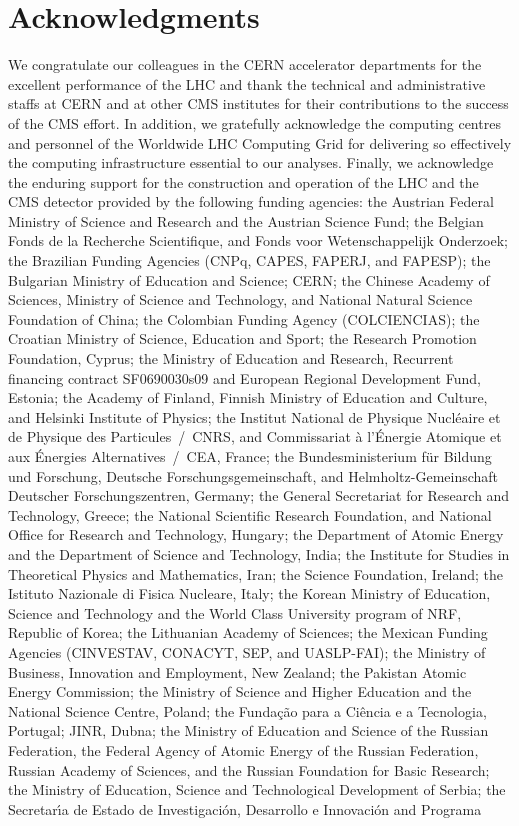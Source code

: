 \documentclass[12pt,twoside,a4paper,cmspaper,final,collab]{cms-tdr}
\begin{document}
\section*{Acknowledgments}

 We congratulate our colleagues in the CERN accelerator departments for the excellent performance of the LHC and thank the technical and administrative staffs at CERN and at other CMS institutes for their contributions to the success of the CMS effort. In addition, we gratefully acknowledge the computing centres and personnel of the Worldwide LHC Computing Grid for delivering so effectively the computing infrastructure essential to our analyses. Finally, we acknowledge the enduring support for the construction and operation of the LHC and the CMS detector provided by the following funding agencies: the Austrian Federal Ministry of Science and Research and the Austrian Science Fund; the Belgian Fonds de la Recherche Scientifique, and Fonds voor Wetenschappelijk Onderzoek; the Brazilian Funding Agencies (CNPq, CAPES, FAPERJ, and FAPESP); the Bulgarian Ministry of Education and Science; CERN; the Chinese Academy of Sciences, Ministry of Science and Technology, and National Natural Science Foundation of China; the Colombian Funding Agency (COLCIENCIAS); the Croatian Ministry of Science, Education and Sport; the Research Promotion Foundation, Cyprus; the Ministry of Education and Research, Recurrent financing contract SF0690030s09 and European Regional Development Fund, Estonia; the Academy of Finland, Finnish Ministry of Education and Culture, and Helsinki Institute of Physics; the Institut National de Physique Nucl\'eaire et de Physique des Particules~/~CNRS, and Commissariat \`a l'\'Energie Atomique et aux \'Energies Alternatives~/~CEA, France; the Bundesministerium f\"ur Bildung und Forschung, Deutsche Forschungsgemeinschaft, and Helmholtz-Gemeinschaft Deutscher Forschungszentren, Germany; the General Secretariat for Research and Technology, Greece; the National Scientific Research Foundation, and National Office for Research and Technology, Hungary; the Department of Atomic Energy and the Department of Science and Technology, India; the Institute for Studies in Theoretical Physics and Mathematics, Iran; the Science Foundation, Ireland; the Istituto Nazionale di Fisica Nucleare, Italy; the Korean Ministry of Education, Science and Technology and the World Class University program of NRF, Republic of Korea; the Lithuanian Academy of Sciences; the Mexican Funding Agencies (CINVESTAV, CONACYT, SEP, and UASLP-FAI); the Ministry of Business, Innovation and Employment, New Zealand; the Pakistan Atomic Energy Commission; the Ministry of Science and Higher Education and the National Science Centre, Poland; the Funda\c{c}\~ao para a Ci\^encia e a Tecnologia, Portugal; JINR, Dubna; the Ministry of Education and Science of the Russian Federation, the Federal Agency of Atomic Energy of the Russian Federation, Russian Academy of Sciences, and the Russian Foundation for Basic Research; the Ministry of Education, Science and Technological Development of Serbia; the Secretar\'{\i}a de Estado de Investigaci\'on, Desarrollo e Innovaci\'on and Programa 
\end{document}
